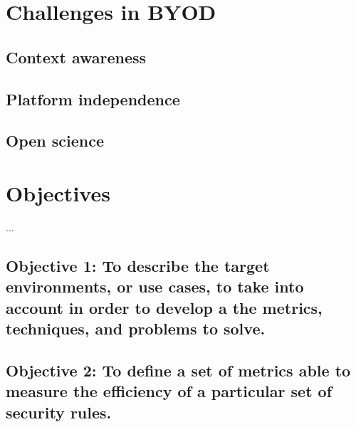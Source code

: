 \section{Challenges in BYOD}
\label{sec:intro:challenges}


\subsection{Context awareness}
\label{subsec:context}


\subsection{Platform independence}
\label{subsec:platf_ind}


\subsection{Open science}
\label{subsec:opS}


\section{Objectives}                     
\label{sec:intro:motivation}

...

\newcommand{\objectivescenarios}{To describe the target environments, or use cases, to take into account in order to develop a the metrics, techniques, and problems to solve.} %

 \subsection*{Objective 1: \objectivescenarios}
\label{subsec:intro:obj:problems}

\newcommand{\objectivemetrics}{To define a set of metrics able to measure the efficiency of a particular set of security rules.}

\subsection*{Objective 2: \objectivemetrics} 
\label{subsec:intro:obj:methodology}

